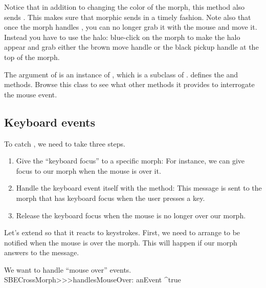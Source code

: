 \documentclass[a4paper,10pt,twoside]{book}
\begin{document}
Notice that in addition to changing the color of the morph, this method also sends .
This makes sure that morphic sends  in a timely fashion.
Note also that once the morph handles , you can no longer grab it with the mouse and move it.
Instead you have to use the halo: blue-click on the morph to make the halo appear and grab either the brown move handle \moveHandle{} or the black pickup handle \grabHandle{} at the top of the morph.

The  argument of  is an instance of \mbox{,} which is a subclass of .
 defines the  and  methods.
Browse this class to see what other methods it provides to interrogate the mouse event.

\subsection{Keyboard events}

To catch , we need to take three steps.
\begin{enumerate}
	\item Give the ``keyboard focus'' to a specific morph:
	For instance, we can give focus to our morph when the mouse is over it.
	\item Handle the keyboard event itself with the  method:
	This message is sent to the morph that has keyboard focus when the user presses a key.
	\item Release the keyboard focus when the mouse is no longer over our morph.
\end{enumerate}

Let's extend  so that it reacts to keystrokes.
First, we need to arrange to be notified when the mouse is over the morph.
This will happen if our morph answers  to the  message.

\begin{method}{We want to handle ``mouse over'' events.} 
SBECrossMorph>>>handlesMouseOver: anEvent
	^true
\end{method}
\end{document}
